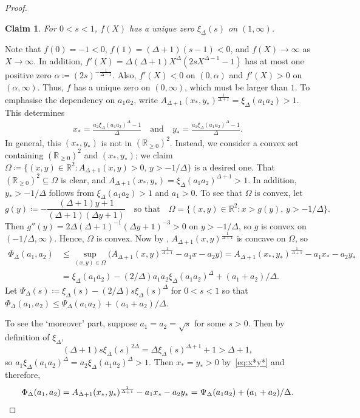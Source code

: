 \documentclass{article}
\makeatletter
\numberwithin{equation}{section}
\theoremstyle{plain}
\newtheorem{claim}[theorem]{Claim}
\theoremstyle{definition}
\theoremstyle{remark} %
\newenvironment{claimproof}[1][Proof]{\par
    \pushQED{\qed}%
    \renewcommand{\qedsymbol}{$\blacksquare$}
    \normalfont \topsep6\p@\@plus6\p@\relax
    \trivlist
    \item[\hskip\labelsep
    \textit{#1}\@addpunct{.}~]\ignorespaces
}{%
    \popQED\endtrivlist\@endpefalse
}
\newcommand{\defeq}{\coloneqq}
\newcommand{\RR}{\mathbb{R}}
\makeatother
\begin{document}
\begin{proof}
    \begin{claim}
        For \(0<s<1\), $f(X)$ has a unique zero \(\xi_\Delta (s)\) on \((1,\infty)\).
    \end{claim}
    \begin{claimproof}
        Note that \(f(0)=-1<0\), \(f(1)=(\Delta+1)(s-1)<0\), and \(f(X)\to\infty\) as \(X\to\infty\).
        In addition, \(f'(X)=\Delta(\Delta+1) X^\Delta (2sX^{\Delta-1}-1)\) has at most one positive zero \(\alpha\defeq (2s)^{-\frac{1}{\Delta-1}}\). Also, \(f'(X)<0\) on \((0,\alpha)\) and \(f'(X)>0\) on \((\alpha,\infty)\). Thus, \(f\) has a unique zero on \((0,\infty)\), which must be larger than \(1\).
    \end{claimproof}
    To emphasise the dependency on $a_1a_2$, write
    \( A_{\Delta+1}(x_*,y_*)^{\frac{1}{\Delta+1}}=\xi_\Delta(a_1a_2) > 1\). This determines
    \begin{align}\label{eq:x*y*}
        x_* = \frac{a_2 \xi_\Delta(a_1a_2)^\Delta - 1}{\Delta}
        \quad\text{and}\quad
        y_* = \frac{a_1 \xi_\Delta(a_1a_2)^\Delta - 1}{\Delta}.
    \end{align}
    In general, this \((x_*,y_*)\) is not in \((\RR_{\ge0})^2\). Instead, we consider a convex set containing \((\RR_{\ge0})^2\) and \((x_*,y_*)\); we claim \(\Omega\defeq \{(x,y)\in\RR^2 : A_{\Delta+1}(x,y)>0,\, y>-1/\Delta\}\) is a desired one. That \((\RR_{\ge0})^2\subseteq \Omega\) is clear, and \(A_{\Delta+1}(x_*,y_*) = \xi_\Delta(a_1a_2)^{\Delta+1}>1\). In addition, \(y_*>-1/\Delta\) follows from \(\xi_\Delta(a_1a_2)>1\) and \(a_1>0\). To see that \(\Omega\) is convex, let
    \[
        g(y)\defeq -\frac{(\Delta+1)y+1}{(\Delta+1)(\Delta y+1)}
        \quad\text{so that}\quad
        \Omega = \{ (x,y)\in\RR^2 : x>g(y),\, y>-1/\Delta \}.
    \]
    Then \(g''(y)=2\Delta(\Delta+1)^{-1}(\Delta y+1)^{-3}>0\) on \(y>-1/\Delta\), so \(g\) is convex on \((-1/\Delta,\infty)\). Hence, \(\Omega\) is convex. Now by , \(A_{\Delta+1}(x,y)^{\frac{1}{\Delta+1}}\) is concave on \(\Omega\), so
    \begin{align*}
        \Phi_\Delta(a_1,a_2)
        &\le \sup_{(x,y)\in\Omega} \bigl( A_{\Delta+1}(x,y)^{\frac{1}{\Delta+1}} - a_1x - a_2y \bigr)
        = A_{\Delta+1}(x_*,y_*)^{\frac{1}{\Delta+1}} - a_1x_* - a_2y_*
        \\&= \xi_\Delta(a_1a_2) - (2/\Delta)a_1a_2 \xi_\Delta(a_1a_2)^\Delta + (a_1+a_2)/\Delta.
    \end{align*}
    Let \(\Psi_\Delta(s)\defeq \xi_\Delta(s) - (2/\Delta) s\xi_\Delta(s)^\Delta\) for \(0<s<1\) so that $\Phi_\Delta(a_1,a_2)\leq \Psi_\Delta(a_1a_2) + (a_1+a_2)/\Delta$.

    To see the `moreover' part, suppose \(a_1=a_2=\sqrt{s}\) for some \(s>0\). Then by definition of $\xi_\Delta$,
    \[
        (\Delta+1) s \xi_\Delta(s)^{2\Delta} = \Delta \xi_\Delta(s)^{\Delta+1} + 1 > \Delta+1,
    \]
    so \(a_1 \xi_\Delta(a_1a_2)^{\Delta} = a_2 \xi_\Delta(a_1a_2)^{\Delta} > 1\). Then \(x_*=y_*>0\) by~\eqref{eq:x*y*} and therefore,
    \[
        \Phi_\Delta(a_1,a_2) = A_{\Delta+1}(x_*,y_*)^{\frac{1}{\Delta+1}} - a_1x_* - a_2y_* = \Psi_\Delta(a_1a_2) + (a_1+a_2)/\Delta. \qedhere
    \]
\end{proof}
\end{document}
